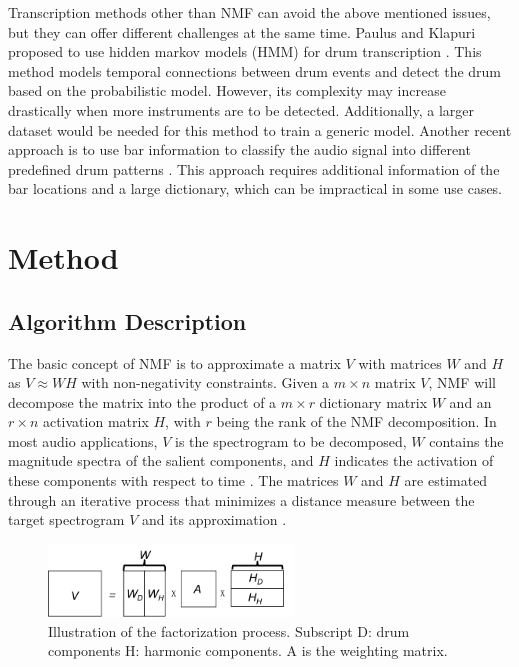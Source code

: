 \documentclass{article}
\begin{document}
Transcription methods other than NMF can avoid the above mentioned issues, but they can offer different challenges at the same time. Paulus and Klapuri proposed to use hidden markov models (HMM) for drum transcription \cite{Paulus2009a}. This method models temporal connections between drum events and detect the drum based on the probabilistic model. However, its complexity may increase drastically when more instruments are to be detected. Additionally, a larger dataset would be needed for this method to train a generic model. Another recent approach is to use bar information to classify the audio signal into different predefined drum patterns \cite{Thompson2014}. This approach requires additional information of the bar locations and a large dictionary, which can be impractical in some use cases.   


\section{Method}\label{sec:method}
\subsection{Algorithm Description}\label{subsec:algorithm}
The basic concept of NMF is to approximate a matrix $V$ with matrices $W$ and $H$ as $V \approx WH$ with non-negativity constraints. Given a $m \times n$ matrix $V$, NMF will decompose the matrix into the product of a $m \times r$ dictionary matrix $W$ and an $r \times n$ activation matrix $H$, with $r$ being the rank of the NMF decomposition. In most audio applications, $V$ is the spectrogram to be decomposed, $W$ contains the magnitude spectra of the salient components, and $H$ indicates the activation of these components with respect to time \cite{smaragdis_non-negative_2003}. The matrices $W$ and $H$ are estimated through an iterative process that minimizes a distance measure between the target spectrogram $V$ and its approximation \cite{lee_algorithms_2000}. 

\begin{figure}
 \centering 
  \centerline{
 \includegraphics[width=6.5cm]{factorization.png}}
 \caption{Illustration of the factorization process. Subscript $\mathrm{D}$: drum components $\mathrm{H}$: harmonic components. $\mathrm{A}$ is the weighting matrix. }
 \label{fig:factorization}
\end{figure}
\end{document}
